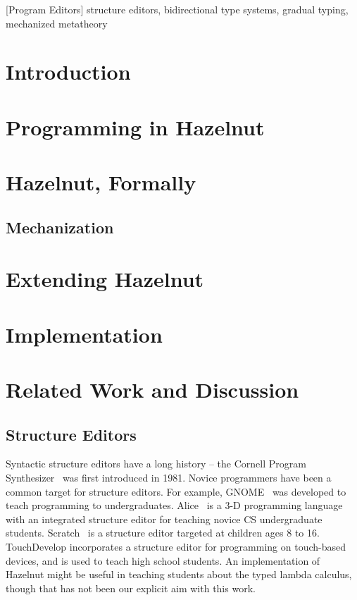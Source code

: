 \documentclass[9pt]{sigplanconf}
\begin{document}
[Program Editors]
\keywords
structure editors, bidirectional type systems, gradual typing, mechanized metatheory

\section{Introduction}\label{sec:introduction}


\section{Programming in Hazelnut}\label{sec:example}


\section{Hazelnut, Formally}
\label{sec:hazel}


\subsection{Mechanization}
\label{sec:mech}\label{sec:mt}


\section{Extending Hazelnut}\label{sec:extending}


\section{Implementation}
\label{sec:impl}


\section{Related Work and Discussion}\label{sec:rw}
\subsection{Structure Editors}
Syntactic structure editors have a long history -- the Cornell Program
Synthesizer~\cite{teitelbaum_cornell_1981} was first introduced in
1981. Novice programmers have been a common target for structure
editors. For example, GNOME~\cite{garlan_gnome:_1984} was developed to
teach programming to undergraduates.
Alice~\cite{Conway:2000:ALL:332040.332481} is a 3-D programming language
with an integrated structure editor for teaching novice CS undergraduate
students. Scratch~\cite{Resnick:2009:SP:1592761.1592779} is a structure
editor targeted at children ages 8 to 16.
TouchDevelop \cite{tillmann_touchdevelop:_2011} incorporates a structure
editor for programming on touch-based devices, and is used to teach high
school students. An implementation of Hazelnut might be useful in teaching
students about the typed lambda calculus, though that has not been our
explicit aim with this work.
\end{document}
